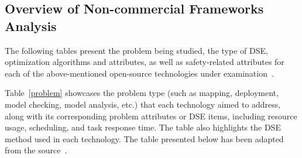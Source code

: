 

\subsection{Overview of Non-commercial Frameworks Analysis}

The following tables present the problem being studied, the type of DSE, optimization algorithms and attributes, as well as safety-related attributes for each of the above-mentioned open-source technologies under examination~\cite{askaripoor2022architecture}.





Table~\ref{problem} showcases the problem type (such as mapping, deployment, model checking, model analysis, etc.) that each technology aimed to address, along with its corresponding problem attributes or DSE items, including resource usage, scheduling, and task response time. The table also highlights the DSE method used in each technology. The table presented below has been adapted from the source~\cite{askaripoor2022architecture}.

